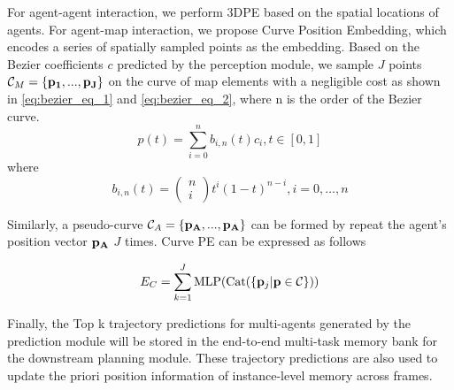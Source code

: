 For agent-agent interaction, we perform 3DPE\cite{liu2022petr,yan2023cross} based on the spatial locations of agents. For agent-map interaction, we propose Curve Position Embedding, which encodes a series of spatially sampled points as the embedding. Based on the Bezier coefficients $c$ predicted by the perception module, we sample $J$ points $\mathcal{C}_M = \{\bf{p}_1,...,\bf{p}_J\}$ on the curve of map elements with a negligible cost as shown in \cref{eq:bezier_eq_1} and \cref{eq:bezier_eq_2}, where n is the order of the Bezier curve.
\begin{equation}
p(t)=\sum_{i=0}^n b_{i, n}(t) c_i, t \in[0,1]
\label{eq:bezier_eq_1}
\end{equation}
where
\begin{equation}
b_{i, n}(t)=\left(\begin{array}{c}
n \\
i
\end{array}\right) t^i(1-t)^{n-i}, i=0, \ldots, n
\label{eq:bezier_eq_2}
\end{equation}

Similarly, a pseudo-curve $\mathcal{C}_A = \{\bf{p}_A,...,\bf{p}_A\}$ can be formed by repeat the agent's position vector $\bf{p}_A$ $J$ times. Curve PE can be expressed as follows

\begin{equation}
    E_{C} = \sum\limits_{k = 1}^J {{\rm{ML}}{{\rm{P}}}({\rm{Cat}}(\{ {{\bf{p}}_j}|{\bf{p}} \in {\cal C}\} ))} 
    \label{eq:ts_align_pe_agent}
\end{equation}

Finally, the Top k trajectory predictions for multi-agents generated by the prediction module will be stored in the end-to-end multi-task memory bank for the downstream planning module. These trajectory predictions are also used to update the priori position information of instance-level memory across frames.

